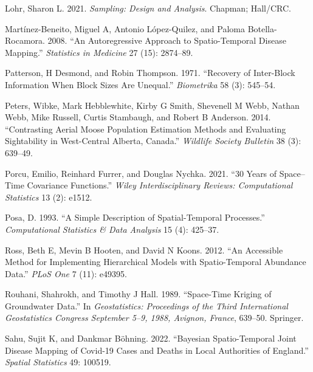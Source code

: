\documentclass[smallextended]{svjour3}       %
\newlength{\cslhangindent}
\newlength{\cslentryspacingunit} %
\newenvironment{CSLReferences}[2] %
 {%
  \setlength{\parindent}{0pt}
  \ifodd #1
  \let\oldpar\par
  \def\par{\hangindent=\cslhangindent\oldpar}
  \fi
  \setlength{\parskip}{#2\cslentryspacingunit}
 }%
 {}
\begin{document}
\begin{CSLReferences}{1}{0}
\leavevmode{}%
Lohr, Sharon L. 2021. \emph{Sampling: Design and Analysis}. Chapman;
Hall/CRC.

\leavevmode{}%
Martínez-Beneito, Miguel A, Antonio López-Quilez, and Paloma
Botella-Rocamora. 2008. {``An Autoregressive Approach to Spatio-Temporal
Disease Mapping.''} \emph{Statistics in Medicine} 27 (15): 2874--89.

\leavevmode{}%
Patterson, H Desmond, and Robin Thompson. 1971. {``Recovery of
Inter-Block Information When Block Sizes Are Unequal.''}
\emph{Biometrika} 58 (3): 545--54.

\leavevmode{}%
Peters, Wibke, Mark Hebblewhite, Kirby G Smith, Shevenell M Webb, Nathan
Webb, Mike Russell, Curtis Stambaugh, and Robert B Anderson. 2014.
{``Contrasting Aerial Moose Population Estimation Methods and Evaluating
Sightability in West-Central Alberta, Canada.''} \emph{Wildlife Society
Bulletin} 38 (3): 639--49.

\leavevmode{}%
Porcu, Emilio, Reinhard Furrer, and Douglas Nychka. 2021. {``30 Years of
Space--Time Covariance Functions.''} \emph{Wiley Interdisciplinary
Reviews: Computational Statistics} 13 (2): e1512.

\leavevmode{}%
Posa, D. 1993. {``A Simple Description of Spatial-Temporal Processes.''}
\emph{Computational Statistics \& Data Analysis} 15 (4): 425--37.

\leavevmode{}%
Ross, Beth E, Mevin B Hooten, and David N Koons. 2012. {``An Accessible
Method for Implementing Hierarchical Models with Spatio-Temporal
Abundance Data.''} \emph{PLoS One} 7 (11): e49395.

\leavevmode{}%
Rouhani, Shahrokh, and Timothy J Hall. 1989. {``Space-Time Kriging of
Groundwater Data.''} In \emph{Geostatistics: Proceedings of the Third
International Geostatistics Congress September 5--9, 1988, Avignon,
France}, 639--50. Springer.

\leavevmode{}%
Sahu, Sujit K, and Dankmar Böhning. 2022. {``Bayesian Spatio-Temporal
Joint Disease Mapping of Covid-19 Cases and Deaths in Local Authorities
of England.''} \emph{Spatial Statistics} 49: 100519.


\end{CSLReferences}
\end{document}
